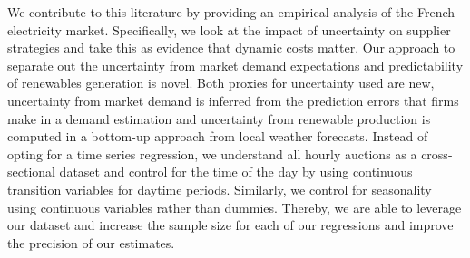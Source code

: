We contribute to this literature by providing an empirical analysis of the French electricity market.
Specifically, we look at the impact of uncertainty on supplier strategies and take this as evidence that dynamic costs matter. 
 Our approach to separate out the uncertainty from market demand expectations and predictability of renewables generation is novel. Both proxies for uncertainty used are new, uncertainty from market demand is inferred from the prediction errors that firms make in a demand estimation and uncertainty from renewable production is computed in a bottom-up approach from local weather forecasts.
Instead of opting for a time series regression, we understand all hourly auctions as a cross-sectional dataset and control for the time of the day by using continuous transition variables for daytime periods. Similarly, we control for seasonality using continuous variables rather than dummies.  Thereby, %
we are able to leverage our dataset and increase the sample size for each of our regressions and improve the precision of our estimates. 



%
%

